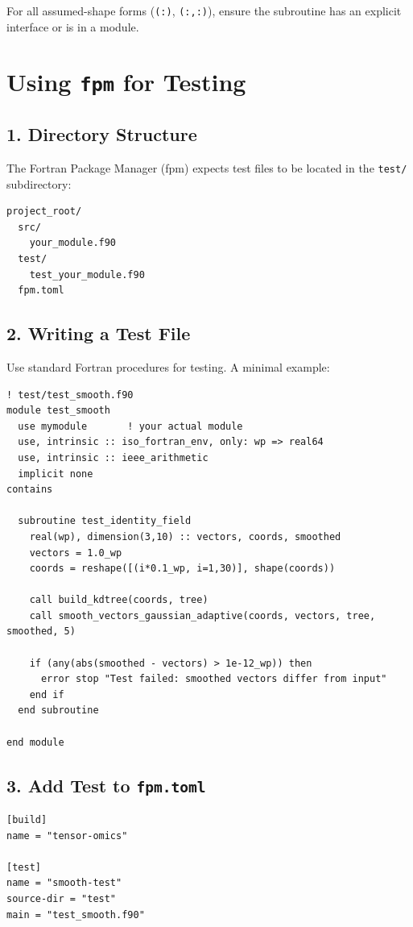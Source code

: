 \documentclass{article}
\begin{document}
\noindent For all assumed-shape forms (\texttt{(:)}, \texttt{(:,:)}), ensure the subroutine has an explicit interface or is in a module.

\section{Using \texttt{fpm} for Testing}

\subsection{1. Directory Structure}
The Fortran Package Manager (fpm) expects test files to be located in the \texttt{test/} subdirectory:

\begin{verbatim}
project_root/
  src/
    your_module.f90
  test/
    test_your_module.f90
  fpm.toml
\end{verbatim}

\subsection{2. Writing a Test File}
Use standard Fortran procedures for testing. A minimal example:

\begin{verbatim}
! test/test_smooth.f90
module test_smooth
  use mymodule       ! your actual module
  use, intrinsic :: iso_fortran_env, only: wp => real64
  use, intrinsic :: ieee_arithmetic
  implicit none
contains

  subroutine test_identity_field
    real(wp), dimension(3,10) :: vectors, coords, smoothed
    vectors = 1.0_wp
    coords = reshape([(i*0.1_wp, i=1,30)], shape(coords))

    call build_kdtree(coords, tree)
    call smooth_vectors_gaussian_adaptive(coords, vectors, tree, smoothed, 5)

    if (any(abs(smoothed - vectors) > 1e-12_wp)) then
      error stop "Test failed: smoothed vectors differ from input"
    end if
  end subroutine

end module
\end{verbatim}

\subsection{3. Add Test to \texttt{fpm.toml}}

\begin{verbatim}
[build]
name = "tensor-omics"

[test]
name = "smooth-test"
source-dir = "test"
main = "test_smooth.f90"
\end{verbatim}
\end{document}
